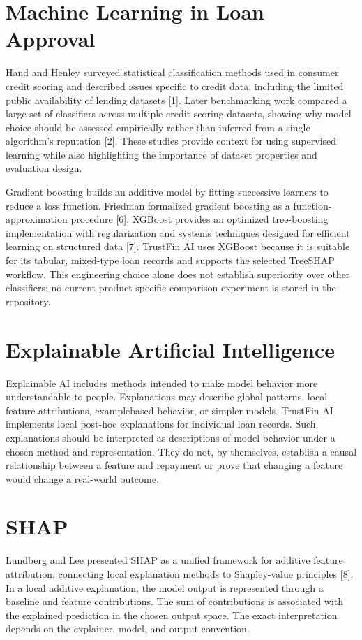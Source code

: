\documentclass[12pt,a4paper]{report}
\begin{document}
\section{Machine Learning in Loan Approval}
Hand and Henley surveyed statistical classification methods used in consumer credit scoring and described issues specific to credit data, including the limited public availability of lending datasets [1]. Later benchmarking work compared a large set of classifiers across multiple credit-scoring datasets, showing why model choice should be assessed empirically rather than inferred from a single algorithm’s reputation [2]. These studies provide context for using supervised learning while also highlighting the importance of dataset properties and evaluation design.

Gradient boosting builds an additive model by fitting successive learners to reduce a loss function. Friedman formalized gradient boosting as a function-approximation procedure [6]. XGBoost provides an optimized tree-boosting implementation with regularization and systems techniques designed for efficient learning on structured data [7]. TrustFin AI uses XGBoost because it is suitable for its tabular, mixed-type loan records and supports the selected TreeSHAP workflow. This engineering choice alone does not establish superiority over other classifiers; no current product-specific comparison experiment is stored in the repository.

\section{Explainable Artificial Intelligence}
Explainable AI includes methods intended to make model behavior more understandable to people. Explanations may describe global patterns, local feature attributions, examplebased behavior, or simpler models. TrustFin AI implements local post-hoc explanations for individual loan records. Such explanations should be interpreted as descriptions of model behavior under a chosen method and representation. They do not, by themselves, establish a causal relationship between a feature and repayment or prove that changing a feature would change a real-world outcome.

\section{SHAP}
Lundberg and Lee presented SHAP as a unified framework for additive feature attribution, connecting local explanation methods to Shapley-value principles [8]. In a local additive explanation, the model output is represented through a baseline and feature contributions. The sum of contributions is associated with the explained prediction in the chosen output space. The exact interpretation depends on the explainer, model, and output convention.
\end{document}
